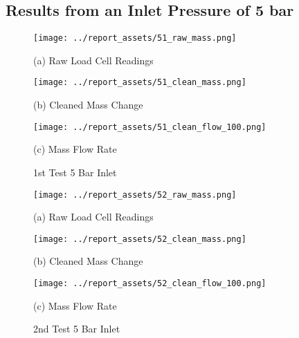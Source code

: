 \vfill

\newpage

\subsection{Results from an Inlet Pressure of 5 bar}
\vfill
\begin{figure}[htbp]
    \centering

    \begin{minipage}{0.32\textwidth}
        \centering
        \texttt{[image: ../report\_assets/51\_raw\_mass.png]}
        \caption*{(a) Raw Load Cell Readings}
    \end{minipage}
    \hfill
    \begin{minipage}{0.32\textwidth}
        \centering
        \texttt{[image: ../report\_assets/51\_clean\_mass.png]}
        \caption*{(b) Cleaned Mass Change}
    \end{minipage}
    \hfill
    \begin{minipage}{0.32\textwidth}
        \centering
        \texttt{[image: ../report\_assets/51\_clean\_flow\_100.png]}
        \caption*{(c) Mass Flow Rate}
    \end{minipage}
    \caption{1st Test 5 Bar Inlet}
    
\end{figure}\label{fig:51}
\vfill

\begin{figure}[htbp]
    \centering

    \begin{minipage}{0.32\textwidth}
        \centering
        \texttt{[image: ../report\_assets/52\_raw\_mass.png]}
        \caption*{(a) Raw Load Cell Readings}
    \end{minipage}
    \hfill
    \begin{minipage}{0.32\textwidth}
        \centering
        \texttt{[image: ../report\_assets/52\_clean\_mass.png]}
        \caption*{(b) Cleaned Mass Change}
    \end{minipage}
    \hfill
    \begin{minipage}{0.32\textwidth}
        \centering
        \texttt{[image: ../report\_assets/52\_clean\_flow\_100.png]}
        \caption*{(c) Mass Flow Rate}
    \end{minipage}
    \caption{2nd Test 5 Bar Inlet}
    
\end{figure}\label{fig:52}
\vfill

